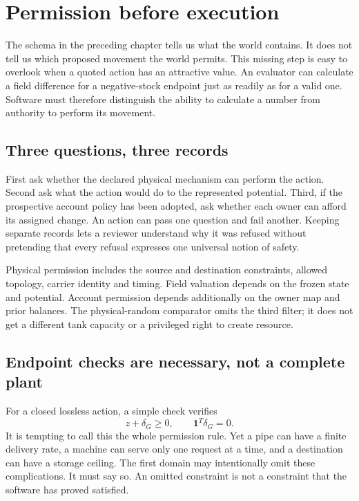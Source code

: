 \chapter{Permission before execution}\label{ch:permission}
The schema in the preceding chapter tells us what the world contains.
It does not tell us which proposed movement the world permits. This missing
step is easy to overlook when a quoted action has an attractive value.
An evaluator can calculate a field difference for a negative-stock endpoint
just as readily as for a valid one. Software must therefore distinguish
the ability to calculate a number from authority to perform its movement.

\section{Three questions, three records}
First ask whether the declared physical mechanism can perform the action.
Second ask what the action would do to the represented potential. Third,
if the prospective account policy has been adopted, ask whether each owner
can afford its assigned change. An action can pass one question and fail
another. Keeping separate records lets a reviewer understand why it was
refused without pretending that every refusal expresses one universal
notion of safety.

Physical permission includes the source and destination constraints,
allowed topology, carrier identity and timing. Field valuation depends on
the frozen state and potential. Account permission depends additionally on
the owner map and prior balances. The physical-random comparator omits the
third filter; it does not get a different tank capacity or a privileged
right to create resource.

\section{Endpoint checks are necessary, not a complete plant}
For a closed lossless action, a simple check verifies
\begin{equation}
 z+\delta_G\geq0,\qquad \mathbf1^T\delta_G=0.
\end{equation}
It is tempting to call this the whole permission rule. Yet a pipe can have
a finite delivery rate, a machine can serve only one request at a time, and
a destination can have a storage ceiling. The first domain may intentionally
omit these complications. It must say so. An omitted constraint is not a
constraint that the software has proved satisfied.

